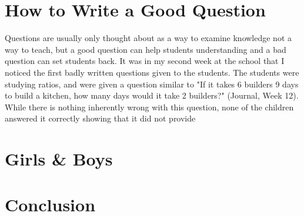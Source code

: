 \documentclass[11pt, a4paper, notitlepage]{article}
\begin{document}
\section*{How to Write a Good Question}
Questions are usually only thought about as a way to examine knowledge not a way to teach, but a good question can help students understanding and a bad question can set students back. It was in my second week at the school that I noticed the first badly written questions given to the students. The students were studying ratios, and were given a question similar to "If it takes 6 builders 9 days to build a kitchen, how many days would it take 2 builders?" (Journal, Week 12). While there is nothing inherently wrong with this question, none of the children answered it correctly showing that it did not provide 

\section*{Girls \& Boys}
\section*{Conclusion}



\end{document}
